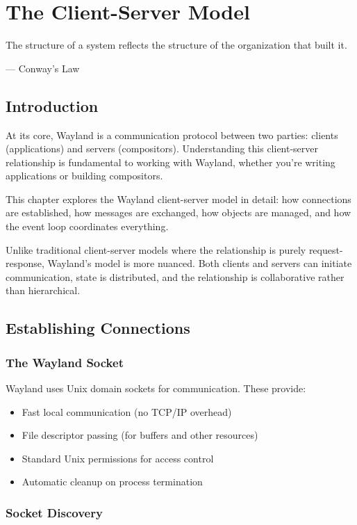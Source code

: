 \chapter{The Client-Server Model}
\label{ch:client-server-model}

\epigraph{The structure of a system reflects the structure of the organization that built it.}{--- Conway's Law}

\section{Introduction}

At its core, Wayland is a communication protocol between two parties: clients (applications) and servers (compositors). Understanding this client-server relationship is fundamental to working with Wayland, whether you're writing applications or building compositors.

This chapter explores the Wayland client-server model in detail: how connections are established, how messages are exchanged, how objects are managed, and how the event loop coordinates everything.

Unlike traditional client-server models where the relationship is purely request-response, Wayland's model is more nuanced. Both clients and servers can initiate communication, state is distributed, and the relationship is collaborative rather than hierarchical.

\section{Establishing Connections}

\subsection{The Wayland Socket}

Wayland uses Unix domain sockets for communication. These provide:
\begin{itemize}
    \item Fast local communication (no TCP/IP overhead)
    \item File descriptor passing (for buffers and other resources)
    \item Standard Unix permissions for access control
    \item Automatic cleanup on process termination
\end{itemize}

\subsection{Socket Discovery}

